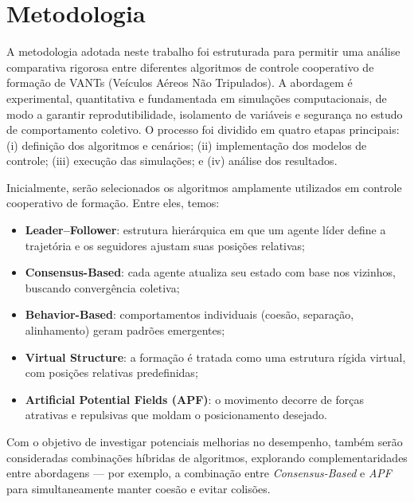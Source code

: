 
\section{Metodologia}

A metodologia adotada neste trabalho foi estruturada para permitir uma análise comparativa rigorosa entre diferentes algoritmos de controle cooperativo de formação de VANTs (Veículos Aéreos Não Tripulados). A abordagem é experimental, quantitativa e fundamentada em simulações computacionais, de modo a garantir reprodutibilidade, isolamento de variáveis e segurança no estudo de comportamento coletivo. O processo foi dividido em quatro etapas principais: (i) definição dos algoritmos e cenários; (ii) implementação dos modelos de controle; (iii) execução das simulações; e (iv) análise dos resultados.

Inicialmente, serão selecionados os algoritmos amplamente utilizados em controle cooperativo de formação. Entre eles, temos:

\begin{itemize}
    \item \textbf{Leader–Follower}: estrutura hierárquica em que um agente líder define a trajetória e os seguidores ajustam suas posições relativas;
    \item \textbf{Consensus-Based}: cada agente atualiza seu estado com base nos vizinhos, buscando convergência coletiva;
    \item \textbf{Behavior-Based}: comportamentos individuais (coesão, separação, alinhamento) geram padrões emergentes;
    \item \textbf{Virtual Structure}: a formação é tratada como uma estrutura rígida virtual, com posições relativas predefinidas;
    \item \textbf{Artificial Potential Fields (APF)}: o movimento decorre de forças atrativas e repulsivas que moldam o posicionamento desejado.
\end{itemize}

Com o objetivo de investigar potenciais melhorias no desempenho, também serão consideradas combinações híbridas de algoritmos, explorando complementaridades entre abordagens — por exemplo, a combinação entre \textit{Consensus-Based} e \textit{APF} para simultaneamente manter coesão e evitar colisões.

